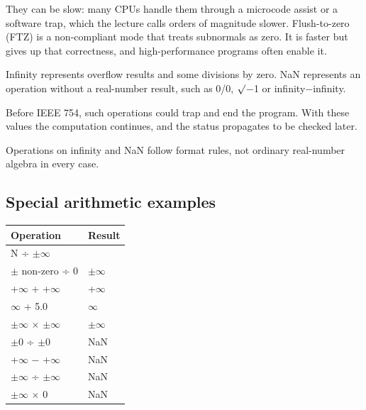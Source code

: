 \documentclass[11pt]{article}
\begin{document}
\begin{keepsection}
They can be slow: many CPUs handle them through a microcode assist or a software trap, which the lecture calls orders of magnitude slower. Flush-to-zero (FTZ) is a non-compliant mode that treats subnormals as zero. It is faster but gives up that correctness, and high-performance programs often enable it.

Infinity represents overflow results and some divisions by zero. NaN represents an operation without a real-number result, such as 0/0, \ensuremath{\surd}\ensuremath{-}1 or infinity\ensuremath{-}infinity.

Before IEEE 754, such operations could trap and end the program. With these values the computation continues, and the status propagates to be checked later.

Operations on infinity and NaN follow format rules, not ordinary real-number algebra in every case.

\begin{keepsection}
\subsection{Special arithmetic examples}

\begin{center}\small\begin{tabularx}{\linewidth}{>{\raggedright\arraybackslash}X>{\raggedright\arraybackslash}X}\toprule
\textbf{Operation} & \textbf{Result} \\ \midrule
N ÷ \ensuremath{\pm}\ensuremath{\infty} & 0 \\
\ensuremath{\pm} non-zero ÷ 0 & \ensuremath{\pm}\ensuremath{\infty} \\
+\ensuremath{\infty} + +\ensuremath{\infty} & +\ensuremath{\infty} \\
\ensuremath{\infty} + 5.0 & \ensuremath{\infty} \\
\ensuremath{\pm}\ensuremath{\infty} \ensuremath{\times} \ensuremath{\pm}\ensuremath{\infty} & \ensuremath{\pm}\ensuremath{\infty} \\
\ensuremath{\pm}0 ÷ \ensuremath{\pm}0 & NaN \\
+\ensuremath{\infty} \ensuremath{-} +\ensuremath{\infty} & NaN \\
\ensuremath{\pm}\ensuremath{\infty} ÷ \ensuremath{\pm}\ensuremath{\infty} & NaN \\
\ensuremath{\pm}\ensuremath{\infty} \ensuremath{\times} 0 & NaN \\
\bottomrule\end{tabularx}\end{center}


\end{keepsection}
\end{keepsection}
\end{document}
